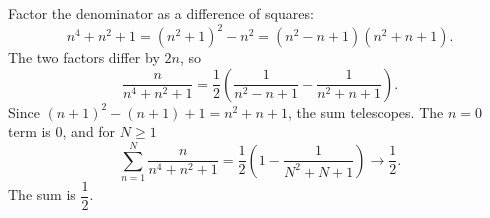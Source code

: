 Factor the denominator as a difference of squares:
\[
n^4+n^2+1=(n^2+1)^2-n^2=(n^2-n+1)(n^2+n+1).
\]
The two factors differ by $2n$, so
\[
\dfrac{n}{n^4+n^2+1}=\dfrac{1}{2}\left(\dfrac{1}{n^2-n+1}-\dfrac{1}{n^2+n+1}\right).
\]
Since $(n+1)^2-(n+1)+1=n^2+n+1$, the sum telescopes. The $n=0$ term is $0$, and for $N\ge1$
\[
\sum_{n=1}^{N}\dfrac{n}{n^4+n^2+1}=\dfrac{1}{2}\left(1-\dfrac{1}{N^2+N+1}\right)\to\dfrac{1}{2} .
\]
The sum is $\boxed{\dfrac{1}{2}}$.
